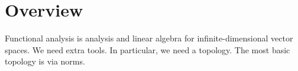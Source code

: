 
\section*{Overview}

Functional analysis is analysis and linear algebra for infinite-dimensional vector spaces.
We need extra tools.
In particular, we need a topology. The most basic topology is via norms.

\blankpage